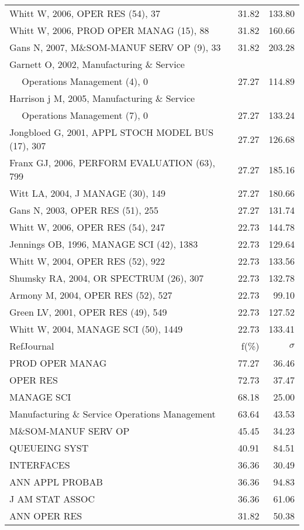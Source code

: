 \documentclass[a4paper,11pt]{report}
\begin{document}
\begin{landscape}
\begin{table}[!ht]
{\begin{tabular}{|l r r|}
Whitt W, 2006, OPER RES (54), 37 & 31.82 & 133.80\\
Whitt W, 2006, PROD OPER MANAG (15), 88 & 31.82 & 160.66\\
Gans N, 2007, M\&SOM-MANUF SERV OP (9), 33 & 31.82 & 203.28\\
Garnett O, 2002, Manufacturing \& Service &  & \\
$\quad$ Operations Management (4), 0 & 27.27 & 114.89\\
Harrison j M, 2005, Manufacturing \& Service &  & \\
$\quad$ Operations Management (7), 0 & 27.27 & 133.24\\
Jongbloed G, 2001, APPL STOCH MODEL BUS (17), 307 & 27.27 & 126.68\\
Franx GJ, 2006, PERFORM EVALUATION (63), 799 & 27.27 & 185.16\\
Witt LA, 2004, J MANAGE (30), 149 & 27.27 & 180.66\\
Gans N, 2003, OPER RES (51), 255 & 27.27 & 131.74\\
Whitt W, 2006, OPER RES (54), 247 & 22.73 & 144.78\\
Jennings OB, 1996, MANAGE SCI (42), 1383 & 22.73 & 129.64\\
Whitt W, 2004, OPER RES (52), 922 & 22.73 & 133.56\\
Shumsky RA, 2004, OR SPECTRUM (26), 307 & 22.73 & 132.78\\
Armony M, 2004, OPER RES (52), 527 & 22.73 & 99.10\\
Green LV, 2001, OPER RES (49), 549 & 22.73 & 127.52\\
Whitt W, 2004, MANAGE SCI (50), 1449 & 22.73 & 133.41\\
\hline
\hline
RefJournal & f(\%) & $\sigma$\\
\hline
PROD OPER MANAG & 77.27 & 36.46\\
OPER RES & 72.73 & 37.47\\
MANAGE SCI & 68.18 & 25.00\\
Manufacturing \& Service Operations Management & 63.64 & 43.53\\
M\&SOM-MANUF SERV OP & 45.45 & 34.23\\
QUEUEING SYST & 40.91 & 84.51\\
INTERFACES & 36.36 & 30.49\\
ANN APPL PROBAB & 36.36 & 94.83\\
J AM STAT ASSOC & 36.36 & 61.06\\
ANN OPER RES & 31.82 & 50.38\\
\hline
\end{tabular}
}
\end{table}

\end{landscape}
\end{document}
